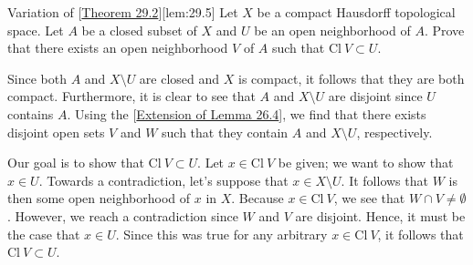 \begin{thmBox}[Lemma]{Variation of [\hyperlink{thm:29.2}{Theorem 29.2}]}[lem:29.5]
    Let \( X \) be a compact Hausdorff topological space.
    Let \( A \) be a closed subset of \( X \) and \( U \) be an open 
    neighborhood of \( A \). 
    Prove that there exists an open neighborhood \( V \) of \( A \) such that 
    \( \mathrm{Cl} \ V \subset U \).


    \baseRule

    \begin{proofBox}
        Since both \( A \) and \( X \setminus U \) are closed and \( X \) is 
        compact, it follows that they are both compact.
        Furthermore, it is clear to see that \( A \) and \( X \setminus U \) 
        are disjoint since \( U \) contains \( A \).
        Using the [\hyperlink{thm:26.4}{Extension of Lemma 26.4}], 
        we find that there exists disjoint open sets 
        \( V \) and \( W \) such that they contain \( A \) and 
        \( X \setminus U \), respectively.
    
        \baseSkip
    
        Our goal is to show that \( \mathrm{Cl} \ V \subset U \). 
        Let \( x \in \mathrm{Cl} \ V \) be given; we want to show that 
        \( x \in U \).
        Towards a contradiction, let's suppose that \( x \in X \setminus U \).
        It follows that \( W \) is then some open neighborhood of \( x \) in 
        \( X \).
        Because \( x \in \mathrm{Cl} \ V \), we see that 
        \( W \cap V \neq \emptyset \).
        However, we reach a contradiction since \( W \) and \( V \) are disjoint.
        Hence, it must be the case that \( x \in U \).
        Since this was true for any arbitrary \( x \in \mathrm{Cl} \ V \), it 
        follows that \( \mathrm{Cl} \ V \subset U \).
    \end{proofBox}
\end{thmBox}


